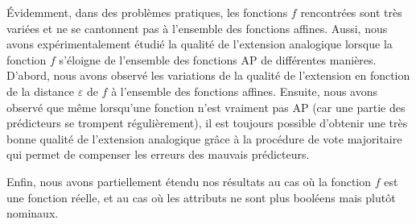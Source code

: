 Évidemment, dans des problèmes pratiques, les fonctions $f$ rencontrées sont très
variées et ne se cantonnent pas à l'ensemble des fonctions affines. Aussi,
nous avons expérimentalement étudié la qualité de l'extension analogique
lorsque la fonction $f$ s'éloigne de l'ensemble des fonctions AP de différentes
manières. D'abord, nous avons observé les variations de la qualité de
l'extension en fonction de la distance $\varepsilon$ de $f$ à l'ensemble des
fonctions affines. Ensuite, nous avons observé que même lorsqu'une fonction
n'est vraiment pas AP (car une partie des prédicteurs se trompent
régulièrement), il est toujours possible d'obtenir une très bonne qualité de
l'extension analogique grâce à la procédure de vote majoritaire qui permet de
compenser les erreurs des mauvais prédicteurs.

Enfin, nous avons partiellement étendu nos résultats au cas où la fonction $f$
est une fonction réelle, et au cas où les attributs ne sont plus booléens mais
plutôt nominaux.
